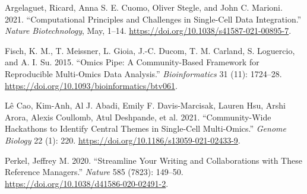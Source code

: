 \documentclass[smallextended]{svjour3}       %
\newlength{\cslhangindent}
\newlength{\cslentryspacingunit} %
\newenvironment{CSLReferences}[2] %
 {%
  \setlength{\parindent}{0pt}
  \ifodd #1
  \let\oldpar\par
  \def\par{\hangindent=\cslhangindent\oldpar}
  \fi
  \setlength{\parskip}{#2\cslentryspacingunit}
 }%
 {}
\begin{document}
\hypertarget{refs}{}
\begin{CSLReferences}{1}{0}
\leavevmode\hypertarget{ref-argelaguet_computational_2021}{}%
Argelaguet, Ricard, Anna S. E. Cuomo, Oliver Stegle, and John C. Marioni. 2021. {``Computational Principles and Challenges in Single-Cell Data Integration.''} \emph{Nature Biotechnology}, May, 1--14. \url{https://doi.org/10.1038/s41587-021-00895-7}.

\leavevmode\hypertarget{ref-fisch_omics_2015}{}%
Fisch, K. M., T. Meissner, L. Gioia, J.-C. Ducom, T. M. Carland, S. Loguercio, and A. I. Su. 2015. {``Omics {Pipe}: A Community-Based Framework for Reproducible Multi-Omics Data Analysis.''} \emph{Bioinformatics} 31 (11): 1724--28. \url{https://doi.org/10.1093/bioinformatics/btv061}.

\leavevmode\hypertarget{ref-le_cao_community-wide_2021}{}%
Lê Cao, Kim-Anh, Al J. Abadi, Emily F. Davis-Marcisak, Lauren Hsu, Arshi Arora, Alexis Coullomb, Atul Deshpande, et al. 2021. {``Community-Wide Hackathons to Identify Central Themes in Single-Cell Multi-Omics.''} \emph{Genome Biology} 22 (1): 220. \url{https://doi.org/10.1186/s13059-021-02433-9}.

\leavevmode\hypertarget{ref-perkel2020}{}%
Perkel, Jeffrey M. 2020. {``Streamline Your Writing {{}} and Collaborations {{}} with These Reference Managers.''} \emph{Nature} 585 (7823): 149--50. \url{https://doi.org/10.1038/d41586-020-02491-2}.

\end{CSLReferences}




\end{document}
